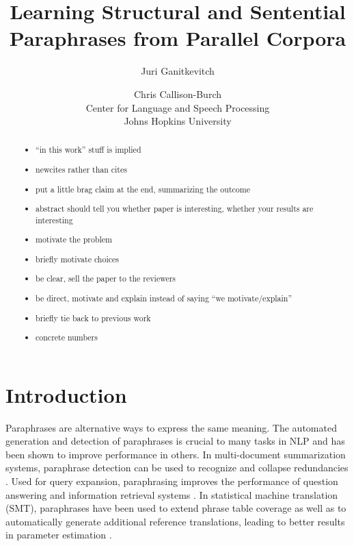 \documentclass[11pt]{article}
\title{Learning Structural and Sentential Paraphrases from Parallel Corpora}
\author{Juri Ganitkevitch \and Chris Callison-Burch\\ 
Center for Language and Speech Processing\\ 
Johns Hopkins University}
\date{}
\begin{document}
\maketitle

\begin{abstract}
  \begin{itemize}
  \item ``in this work'' stuff is implied
  \item newcites rather than cites 
  \item put a little brag claim at the end, summarizing the outcome
  \item abstract should tell you whether paper is interesting, whether
    your results are interesting
  \item motivate the problem
  \item briefly motivate choices
  \item be clear, sell the paper to the reviewers
  \item be direct, motivate and explain instead of saying ``we
    motivate/explain''
  \item briefly tie back to previous work
  \item concrete numbers
  \end{itemize}
\end{abstract}

\section{Introduction} \label{introduction}

Paraphrases are alternative ways to express the same meaning. The
automated generation and detection of paraphrases is crucial to many
tasks in NLP and has been shown to improve performance in others. In
multi-document summarization systems, paraphrase detection can be used
to recognize and collapse redundancies \cite{Barzilay1999}. Used for
query expansion, paraphrasing improves the performance of question
answering \cite{Ravichandran2002,Riezler2007} and information
retrieval systems \cite{Anick1999}. In statistical machine translation
(SMT), paraphrases have been used to extend phrase table coverage
\cite{Callison-Burch2006b} as well as to automatically generate
additional reference translations, leading to better results in
parameter estimation \cite{Madnani2007}.
\end{document}
